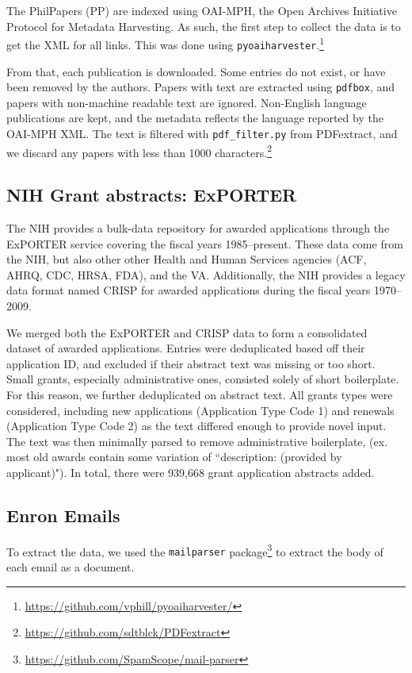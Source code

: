 \documentclass[11pt,a4paper]{article}
\begin{document}
\begin{appendices}
The PhilPapers (PP) are indexed using OAI-MPH, the Open Archives Initiative Protocol for Metadata Harvesting. As such, the first step to collect the data is to get the XML for all links. This was done using \texttt{pyoaiharvester}.\footnote{\url{https://github.com/vphill/pyoaiharvester/}}

From that, each publication is downloaded. Some entries do not exist, or have been removed by the authors. Papers with text are extracted using \texttt{pdfbox}, and papers with non-machine readable text are ignored. Non-English language publications are kept, and the metadata reflects the language reported by the OAI-MPH XML. The text is filtered with \texttt{pdf\_filter.py} from PDFextract, and we discard any papers with less than 1000 characters.\footnote{\url{https://github.com/sdtblck/PDFextract}}


\subsection{NIH Grant abstracts: ExPORTER}

The NIH provides a bulk-data repository for awarded applications through the ExPORTER service covering the fiscal years 1985--present. These data come from the NIH, but also other other Health and Human Services agencies (ACF, AHRQ, CDC, HRSA, FDA), and the VA. Additionally, the NIH provides a legacy data format named CRISP for awarded applications during the fiscal years 1970--2009.

We merged both the ExPORTER and CRISP data to form a consolidated dataset of awarded applications. Entries were deduplicated based off their application ID, and excluded if their abstract text was missing or too short. Small grants, especially administrative ones, consisted solely of short boilerplate. For this reason, we further deduplicated on abstract text. All grants types were considered, including new applications (Application Type Code 1) and renewals (Application Type Code 2) as the text differed enough to provide novel input. The text was then minimally parsed to remove administrative boilerplate, (ex. most old awards contain some variation of ``description: (provided by applicant)"). In total, there were 939,668 grant application abstracts added.

\subsection{Enron Emails}

To extract the data, we used the {\tt mailparser} package\footnote{\url{https://github.com/SpamScope/mail-parser}} to extract the body of each email as a document.


\end{appendices}
\end{document}

